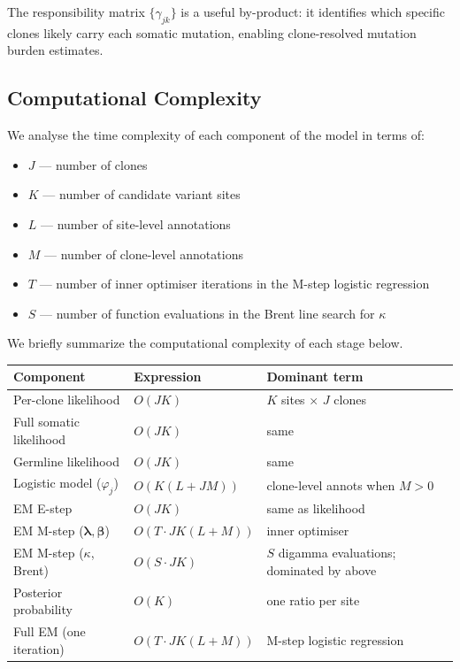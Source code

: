 \documentclass{article}
\begin{document}
The responsibility matrix $\{\gamma_{jk}\}$ is a useful by-product: it
identifies which specific clones likely carry each somatic mutation, enabling
clone-resolved mutation burden estimates.


\subsection*{Computational Complexity}
\label{sec:complexity}

We analyse the time complexity of each component of the model in terms of:
\begin{itemize}
  \item $J$ --- number of clones
  \item $K$ --- number of candidate variant sites
  \item $L$ --- number of site-level annotations
  \item $M$ --- number of clone-level annotations
  \item $T$ --- number of inner optimiser iterations in the M-step logistic regression
  \item $S$ --- number of function evaluations in the Brent line search for $\kappa$
\end{itemize}

We briefly summarize the computational complexity of each stage below.

\begin{center}
\renewcommand{\arraystretch}{1.45}
\begin{tabular}{lll}
\toprule
Component & Expression & Dominant term \\
\midrule
Per-clone likelihood & $O(JK)$ & $K$ sites $\times$ $J$ clones \\
Full somatic likelihood & $O(JK)$ & same \\
Germline likelihood & $O(JK)$ & same \\
Logistic model ($\varphi_j$) & $O(K(L + JM))$ & clone-level annots when $M > 0$ \\
EM E-step & $O(JK)$ & same as likelihood \\
EM M-step ($\boldsymbol{\lambda}, \boldsymbol{\beta}$) & $O(T \cdot JK(L+M))$ & inner optimiser \\
EM M-step ($\kappa$, Brent) & $O(S \cdot JK)$ & $S$ digamma evaluations; dominated by above \\
Posterior probability & $O(K)$ & one ratio per site \\
\midrule
Full EM (one iteration) & $O(T \cdot JK(L+M))$ & M-step logistic regression \\
\bottomrule
\end{tabular}
\end{center}
\end{document}
